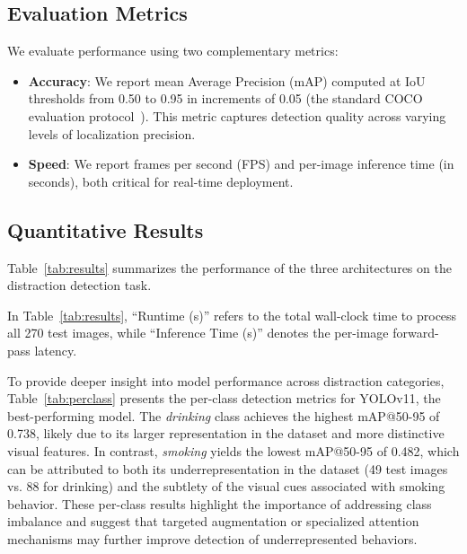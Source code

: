 \documentclass[conference]{IEEEtran}
\newcommand{\rev}[1]{{\color{blue}#1}} %
\begin{document}
\subsection{Evaluation Metrics}

We evaluate performance using two complementary metrics:

\begin{itemize}
\item \textbf{Accuracy}: We report mean Average Precision (mAP) computed at IoU thresholds from 0.50 to 0.95 in increments of 0.05 (the standard COCO evaluation protocol~\cite{lin2014}). This metric captures detection quality across varying levels of localization precision.
\item \textbf{Speed}: We report frames per second (FPS) and per-image inference time (in seconds), both critical for real-time deployment.
\end{itemize}

\subsection{Quantitative Results}

Table~\ref{tab:results} summarizes the performance of the three architectures on the distraction detection task.

\begin{table}[t]
\centering
\caption{Comparative Performance of Object Detection Architectures}
\label{tab:results}
\end{table}


\rev{In Table~\ref{tab:results}, ``Runtime (s)'' refers to the total wall-clock time to process all 270 test images, while ``Inference Time (s)'' denotes the per-image forward-pass latency.}

\rev{To provide deeper insight into model performance across distraction categories, Table~\ref{tab:perclass} presents the per-class detection metrics for YOLOv11, the best-performing model. The \textit{drinking} class achieves the highest mAP@50-95 of 0.738, likely due to its larger representation in the dataset and more distinctive visual features. In contrast, \textit{smoking} yields the lowest mAP@50-95 of 0.482, which can be attributed to both its underrepresentation in the dataset (49 test images vs. 88 for drinking) and the subtlety of the visual cues associated with smoking behavior. These per-class results highlight the importance of addressing class imbalance and suggest that targeted augmentation or specialized attention mechanisms may further improve detection of underrepresented behaviors.}
\end{document}
